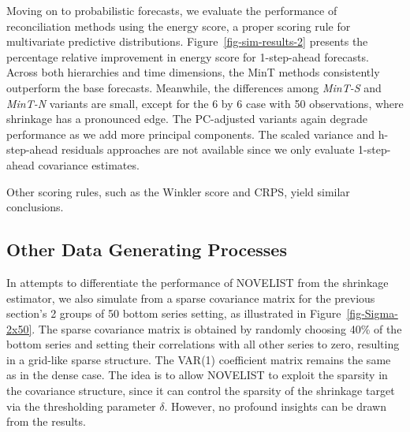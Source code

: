 \documentclass[
  11pt,
  letterpaper,
  DIV=11,
  numbers=noendperiod,
  titlepage]{scrartcl}
\begin{document}
Moving on to probabilistic forecasts, we evaluate the performance of
reconciliation methods using the energy score, a proper scoring rule for
multivariate predictive distributions. Figure~\ref{fig-sim-results-2}
presents the percentage relative improvement in energy score for
1-step-ahead forecasts. Across both hierarchies and time dimensions, the
MinT methods consistently outperform the base forecasts. Meanwhile, the
differences among \emph{MinT-S} and \emph{MinT-N} variants are small,
except for the 6 by 6 case with 50 observations, where shrinkage has a
pronounced edge. The PC-adjusted variants again degrade performance as
we add more principal components. The scaled variance and h-step-ahead
residuals approaches are not available since we only evaluate
1-step-ahead covariance estimates.

Other scoring rules, such as the Winkler score and CRPS, yield similar
conclusions.

\subsection{Other Data Generating
Processes}\label{other-data-generating-processes}

In attempts to differentiate the performance of NOVELIST from the
shrinkage estimator, we also simulate from a sparse covariance matrix
for the previous section's 2 groups of 50 bottom series setting, as
illustrated in Figure~\ref{fig-Sigma-2x50}. The sparse covariance matrix
is obtained by randomly choosing 40\% of the bottom series and setting
their correlations with all other series to zero, resulting in a
grid-like sparse structure. The VAR(1) coefficient matrix remains the
same as in the dense case. The idea is to allow NOVELIST to exploit the
sparsity in the covariance structure, since it can control the sparsity
of the shrinkage target via the thresholding parameter \(\delta\).
However, no profound insights can be drawn from the results.
\end{document}
